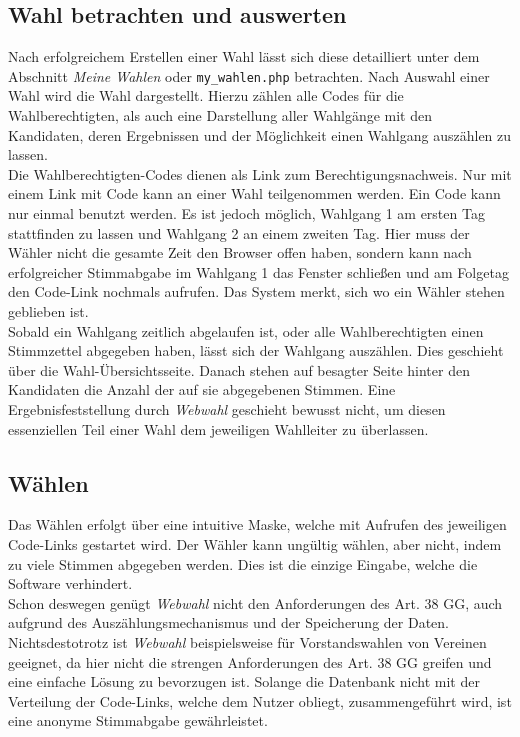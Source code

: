 \documentclass[a4paper]{scrartcl}
\newcommand{\file}[1]{\texttt{#1}}
\begin{document}
	\subsection{Wahl betrachten und auswerten}
	Nach erfolgreichem Erstellen einer Wahl lässt sich diese detailliert unter dem Abschnitt \textit{Meine Wahlen} oder \file{my\_wahlen.php} betrachten. Nach Auswahl einer Wahl wird die Wahl dargestellt. Hierzu zählen alle Codes für die Wahlberechtigten, als auch eine Darstellung aller Wahlgänge mit den Kandidaten, deren Ergebnissen und der Möglichkeit einen Wahlgang auszählen zu lassen.\\
	
	\noindent Die Wahlberechtigten-Codes dienen als Link zum Berechtigungsnachweis. Nur mit einem Link mit Code kann an einer Wahl teilgenommen werden. Ein Code kann nur einmal benutzt werden. Es ist jedoch möglich, Wahlgang 1 am ersten Tag stattfinden zu lassen und Wahlgang 2 an einem zweiten Tag. Hier muss der Wähler nicht die gesamte Zeit den Browser offen haben, sondern kann nach erfolgreicher Stimmabgabe im Wahlgang 1 das Fenster schließen und am Folgetag den Code-Link nochmals aufrufen. Das System merkt, sich wo ein Wähler stehen geblieben ist.\\
	
	\noindent Sobald ein Wahlgang zeitlich abgelaufen ist, oder alle Wahlberechtigten einen Stimmzettel abgegeben haben, lässt sich der Wahlgang auszählen. Dies geschieht über die Wahl-Übersichtsseite. Danach stehen auf besagter Seite hinter den Kandidaten die Anzahl der auf sie abgegebenen Stimmen. Eine Ergebnisfeststellung durch \textit{Webwahl} geschieht bewusst nicht, um diesen essenziellen Teil einer Wahl dem jeweiligen Wahlleiter zu überlassen.
	
	\subsection{Wählen}
	Das Wählen erfolgt über eine intuitive Maske, welche mit Aufrufen des jeweiligen Code-Links gestartet wird. Der Wähler kann ungültig wählen, aber nicht, indem zu viele Stimmen abgegeben werden. Dies ist die einzige Eingabe, welche die Software verhindert.\\
	
	\noindent Schon deswegen genügt \textit{Webwahl} nicht den Anforderungen des Art. 38 GG, auch aufgrund des Auszählungsmechanismus und der Speicherung der Daten. Nichtsdestotrotz ist \textit{Webwahl} beispielsweise für Vorstandswahlen von Vereinen geeignet, da hier nicht die strengen Anforderungen des Art. 38 GG greifen und eine einfache Lösung zu bevorzugen ist. Solange die Datenbank nicht mit der Verteilung der Code-Links, welche dem Nutzer obliegt, zusammengeführt wird, ist eine anonyme Stimmabgabe gewährleistet.
	
	
	
\end{document}

